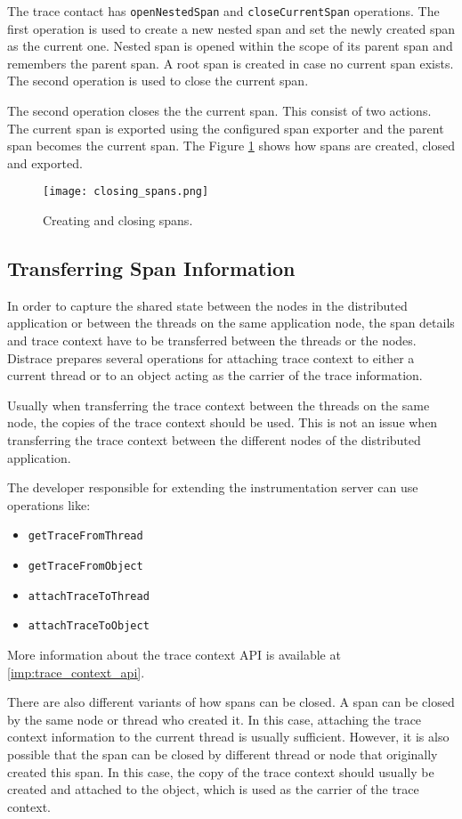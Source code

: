 The trace contact has \texttt{openNestedSpan} and \texttt{closeCurrentSpan} operations. The first operation is used to create a new nested span and set the newly created span as the current one. Nested span is opened within the scope of its parent span and remembers the parent span. A root span is created in case no current span exists. The second operation is used to close the current span.

The second operation closes the the current span. This consist of two actions. The current span is exported using the configured span exporter and the parent span becomes the current span. The Figure \ref{fig:closing_spans} shows how spans are created, closed and exported. \begin{figure}
	\centering
	\texttt{[image: closing\_spans.png]}
	\caption{Creating and closing spans.}
	\label{fig:closing_spans}
\end{figure}

\subsection{Transferring Span Information}
In order to capture the shared state between the nodes in the distributed application or between the threads on the same application node, the span details and trace context have to be transferred between the threads or the nodes. Distrace prepares several operations for attaching trace context to either a current thread or to an object acting as the carrier of the trace information.

Usually when transferring the trace context between the threads on the same node, the copies of the trace context should be used. This is not an issue when transferring the trace context between the different nodes of the distributed application.


The developer responsible for extending the instrumentation server can use operations like:
\begin{itemize}
	\item  \texttt{getTraceFromThread}
	\item \texttt{getTraceFromObject}
	\item \texttt{attachTraceToThread}
	\item \texttt{attachTraceToObject}
\end{itemize}
More information about the trace context API is available at \ref{imp:trace_context_api}.

There are also different variants of how spans can be closed. A span can be closed by the same node or thread who created it. In this case, attaching the trace context information to the current thread is usually sufficient. However, it is also possible that the span can be closed by different thread or node that originally created this span. In this case, the copy of the trace context should usually be created and attached to the object, which is used as the carrier of the trace context.

